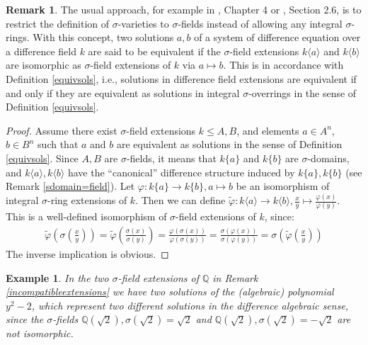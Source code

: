 \documentclass{article}
\def\Q{\mathbb{Q}}
\def\s{\sigma}
\newenvironment{bew}{\begin{proof}[Proof]}{\end{proof}}
\theoremstyle{plain}
\newtheorem{ex}[Satz]{Example}
\theoremstyle{definition}
\newtheorem{rem}[Satz]{Remark}
\begin{document}
\begin{rem}
The usual approach, for example in \cite{cohn}, Chapter 4 or \cite{levin}, Section 2.6, is to restrict the definition of $\s$-varieties to $\s$-fields instead of allowing any integral $\s$-rings. With this concept,
two solutions $a,b$ of a system of difference equation over a difference field $k$ are said to be equivalent if the $\s$-field extensions $k\langle a \rangle$ and $k\langle b \rangle$ are isomorphic as $\s$-field extensions of $k$ via $a \mapsto b$.
This is in accordance with Definition \ref{equivsols}, i.e., solutions in difference field extensions are equivalent if and only if they are equivalent as solutions in integral $\s$-overrings in the sense of Definition \ref{equivsols}.
\begin{bew}
Assume there exist $\s$-field extensions $k \leq A,B$, and elements $a \in A^n$, $b \in B^n$ such that $a$ and $b$ are equivalent as solutions in the sense of Definition \ref{equivsols}. Since $A,B$ are $\s$-fields, it means that $k\{a\}$ and $k\{b\}$ are $\s$-domains, 
and $k\langle a \rangle, k\langle b \rangle$ have the ``canonical'' difference structure induced by $k\{a\}, k\{b\}$ (see Remark \ref{sdomain=field}). Let $\varphi: k\{a\} \rightarrow k\{b\}, a \mapsto b$ be an isomorphism of integral $\s$-ring extensions of $k$.
Then we can define $\tilde \varphi: k \langle a \rangle \rightarrow k\langle b \rangle, \frac{x}{y} \mapsto \frac{\varphi(x)}{\varphi{(y)}}$. This is a well-defined isomorphism of $\s$-field extensions of $k$, since:
\begin{align*}
\tilde \varphi \left(\s \left(\frac{x}{y}\right)\right) = \tilde \varphi \left( \frac{\s \left(x\right)}{\s \left(y\right)}\right) = \frac{ \varphi \left(\s \left(x\right)\right)}{ \varphi \left(\s \left(y\right)\right)} =  \frac{\s \left(\varphi \left(x\right)\right)}{\s \left(\varphi \left(y\right)\right)} = \s \left( \tilde \varphi \left(\frac{x}{y}\right)\right)
\end{align*}
The inverse implication is obvious.
\end{bew}
\end{rem}

\begin{ex}
In the two $\s$-field extensions of $\Q$ in Remark \ref{incompatibleextensions} we have two solutions of the (algebraic) polynomial $y^2-2$, which represent two different solutions in the difference algebraic sense,
since the $\s$-fields $\Q(\sqrt{2}), \s(\sqrt{2}) = \sqrt{2}$ and $\Q(\sqrt{2}), \s(\sqrt{2}) = -\sqrt{2}$ are not isomorphic. 
\end{ex}
\end{document}
